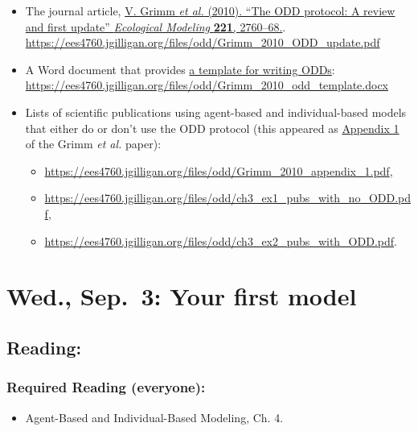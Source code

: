 \documentclass[
]{article}
\providecommand{\tightlist}{%
  \setlength{\itemsep}{0pt}\setlength{\parskip}{0pt}}
\begin{document}
\begin{itemize}
\tightlist
\item
  The journal article, \href{/files/odd/Grimm_2010_ODD_update.pdf}{V.
  Grimm \emph{et al.} (2010). ``The ODD protocol: A review and first
  update'' \emph{Ecological Modeling} \textbf{221}, 2760--68.}.
  \url{https://ees4760.jgilligan.org/files/odd/Grimm_2010_ODD_update.pdf}
\item
  A Word document that provides
  \href{/files/odd/Grimm_2010_odd_template.docx}{a template for writing
  ODDs}:
  \url{https://ees4760.jgilligan.org/files/odd/Grimm_2010_odd_template.docx}
\item
  Lists of scientific publications using agent-based and
  individual-based models that either do or don't use the ODD protocol
  (this appeared as \href{/files/odd/Grimm_2010_appendix_1.pdf}{Appendix
  1} of the Grimm \emph{et al.} paper):

  \begin{itemize}
  \tightlist
  \item
    \url{https://ees4760.jgilligan.org/files/odd/Grimm_2010_appendix_1.pdf},
  \item
    \url{https://ees4760.jgilligan.org/files/odd/ch3_ex1_pubs_with_no_ODD.pdf},
  \item
    \url{https://ees4760.jgilligan.org/files/odd/ch3_ex2_pubs_with_ODD.pdf}.
  \end{itemize}
\end{itemize}

\section{Wed., Sep.~3: Your first
model}\label{wed.-sep.-3-your-first-model}

\subsection{Reading:}\label{reading-4}

\subsubsection{Required Reading
(everyone):}\label{required-reading-everyone-3}

\begin{itemize}
\tightlist
\item
  Agent-Based and Individual-Based Modeling, Ch. 4.
\end{itemize}
\end{document}
